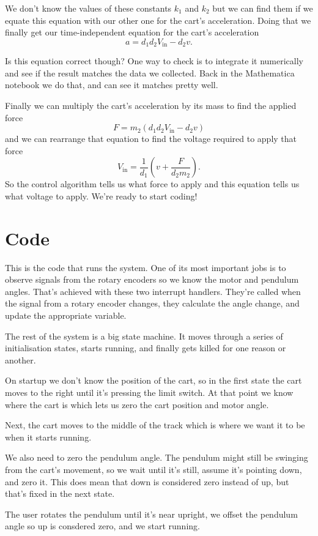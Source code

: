 \documentclass{article}
\begin{document}
We don't know the values of these constants $k_1$ and $k_2$ but we can find them if we equate this equation with our other one for the cart's acceleration. Doing that we finally get our time-independent equation for the cart's acceleration \[a = d_1 d_2 V_\text{in} - d_2 v.\]

Is this equation correct though? One way to check is to integrate it numerically and see if the result matches the data we collected. Back in the Mathematica notebook we do that, and can see it matches pretty well.

Finally we can multiply the cart's acceleration by its mass to find the applied force \[F = m_2 (d_1 d_2 V_\text{in} - d_2 v)\] and we can rearrange that equation to find the voltage required to apply that force \[V_\text{in} = \frac{1}{d_1} \left( v + \frac{F}{d_2 m_2} \right).\] So the control algorithm tells us what force to apply and this equation tells us what voltage to apply. We're ready to start coding!

\section{Code}

This is the code that runs the system. One of its most important jobs is to observe signals from the rotary encoders so we know the motor and pendulum angles. That's achieved with these two interrupt handlers. They're called when the signal from a rotary encoder changes, they calculate the angle change, and update the appropriate variable.

The rest of the system is a big state machine. It moves through a series of initialisation states, starts running, and finally gets killed for one reason or another.

On startup we don't know the position of the cart, so in the first state the cart moves to the right until it's pressing the limit switch. At that point we know where the cart is which lets us zero the cart position and motor angle.

Next, the cart moves to the middle of the track which is where we want it to be when it starts running.

We also need to zero the pendulum angle. The pendulum might still be swinging from the cart's movement, so we wait until it's still, assume it's pointing down, and zero it. This does mean that down is considered zero instead of up, but that's fixed in the next state.

The user rotates the pendulum until it's near upright, we offset the pendulum angle so up is consdered zero, and we start running.
\end{document}
